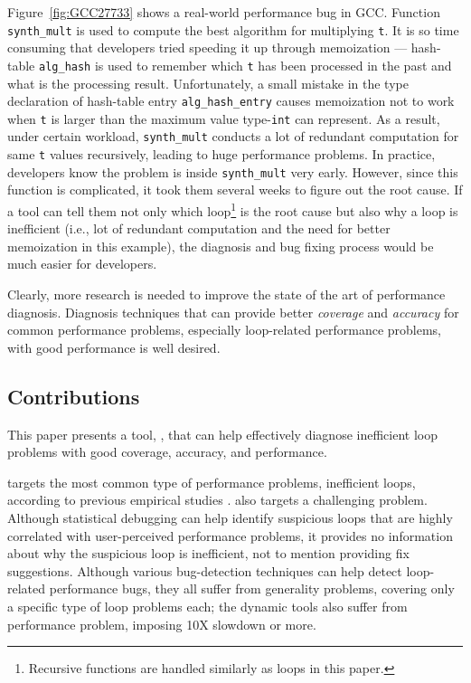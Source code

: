 Figure~\ref{fig:GCC27733} shows a real-world performance bug in GCC. 
Function \texttt{synth\_mult} is used to compute the best algorithm for 
multiplying \texttt{t}. It is so time consuming that developers tried 
speeding it up through memoization ---
hash-table
\texttt{alg\_hash} is used to remember which \texttt{t} has been processed
in the past and what is the processing result. 
Unfortunately, a small mistake in the type declaration of hash-table
entry \texttt{alg\_hash\_entry} causes memoization not to work when \texttt{t}
is larger than the maximum value type-\texttt{int} can represent.
As a result, under certain workload, \texttt{synth\_mult} conducts a lot of
redundant computation for same \texttt{t} values recursively, leading to
huge performance problems.  In practice, developers know the problem is inside
\texttt{synth\_mult} very early. However, since this function is 
complicated, it took them several weeks to figure out the root cause. 
If a tool can tell them not only which loop\footnote{Recursive functions are
handled similarly as loops in this paper.}
is the root cause but also why a loop is inefficient (i.e., lot of redundant
computation and the need for better memoization in this example), 
the diagnosis and bug fixing
process would be much easier for developers. 

Clearly, more research is needed to improve the state of the art of performance
diagnosis. Diagnosis techniques that can provide better
\textit{coverage} and \textit{accuracy} for common performance problems,
especially loop-related performance problems, with good
performance is well desired.


\subsection{Contributions}
This paper presents a tool, \Tool, that can help effectively diagnose
inefficient loop problems with good coverage, accuracy, and performance.

\Tool targets the most common type of performance problems, inefficient
loops, according to previous
empirical studies \citep{SongOOPSLA2014,PerfBug}.
\Tool also targets a challenging problem. Although
statistical debugging \citep{SongOOPSLA2014}
can help identify suspicious loops that are highly correlated with 
user-perceived performance problems,
it provides no information about why the suspicious loop is inefficient,
not to mention providing fix suggestions. Although various
bug-detection techniques \citep{Cachetor,Alabama,CARAMEL} can help detect
loop-related performance bugs, they all suffer from generality problems,
covering only a specific type of loop problems each; the dynamic
tools \citep{Cachetor,Alabama} also suffer from performance
problem, imposing 10X slowdown or more.

